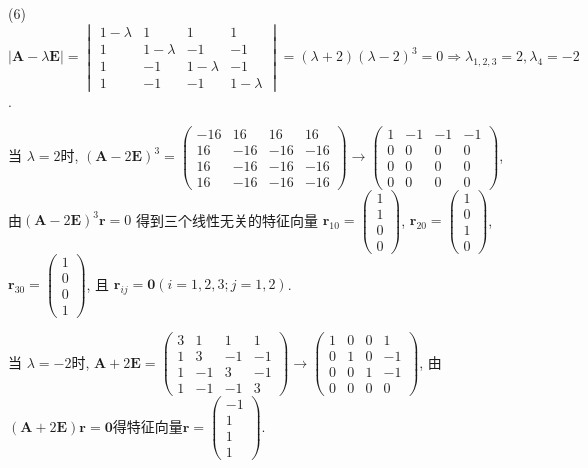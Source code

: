 \begin{solve}
  (6) $|\bm{A}-\lambda\bm{E}|=\begin{vmatrix}1-\lambda&1&1&1\\1&1-\lambda&-1&-1\\1&-1&1-\lambda&-1\\1&-1&-1&1-\lambda\end{vmatrix}=(\lambda+2)(\lambda-2)^3=0\Rightarrow\lambda_{1,2,3}=2,\lambda_4=-2$.

  当 $\lambda=2$时, $(\bm{A}-2\bm{E})^3=\begin{pmatrix}-16&16&16&16\\16&-16&-16&-16\\16&-16&-16&-16\\16&-16&-16&-16\end{pmatrix}\to\begin{pmatrix}1&-1&-1&-1\\0&0&0&0\\0&0&0&0\\0&0&0&0\end{pmatrix}$, 由$(\bm{A}-2\bm{E})^3\bm{r}=0$
  得到三个线性无关的特征向量 $\bm{r}_{10}=\begin{pmatrix}1\\1\\0\\0\end{pmatrix}$,
  $\bm{r}_{20}=\begin{pmatrix}1\\0\\1\\0\end{pmatrix}$,
  $\bm{r}_{30}=\begin{pmatrix}1\\0\\0\\1\end{pmatrix}$, 	
  且 $\bm{r}_{ij}=\bm{0}(i=1,2,3;j=1,2)$.

  当 $\lambda=-2$时, $\bm{A}+2\bm{E}=\begin{pmatrix}3&1&1&1\\1&3&-1&-1\\1&-1&3&-1\\1&-1&-1&3\end{pmatrix}\to\begin{pmatrix}1&0&0&1\\0&1&0&-1\\0&0&1&-1\\0&0&0&0\end{pmatrix}$, 
  由 $(\bm{A}+2\bm{E})\bm{r}=\bm{0}$得特征向量$\bm{r}=\begin{pmatrix}-1\\1\\1\\1\end{pmatrix}$.


\end{solve}

